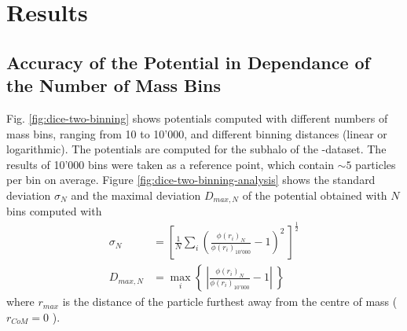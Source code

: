 \section{Results}\label{chap:results}




\subsection{Accuracy of the Potential in Dependance of the Number of Mass Bins}


Fig. \ref{fig:dice-two-binning} shows potentials computed with different numbers of mass bins, ranging from 10 to 10'000, and different binning distances (linear or logarithmic).
The potentials are computed for the subhalo of the \dt-dataset.
The results of 10'000 bins were taken as a reference point, which contain $\sim 5$ particles per bin on average.
Figure \ref{fig:dice-two-binning-analysis} shows the standard deviation $\sigma_N$ and the maximal deviation $D_{max,N}$ of the potential obtained with $N$ bins computed with
%
\begin{align}
	\sigma_N &= \left[ \frac{1}{N} \sum\limits_{i} \left( \frac{\phi(r_i)_N }{\phi(r_{i})_{10'000}} -1 \right)^2 \ \right] ^{\frac{1}{2}} \label{eq:Dtot} \\
	D_{max,N} &= \max \limits_{i} \left\{ \ \left | \frac{\phi(r_i)_N }{\phi(r_{i})_{10'000}} - 1 \right | \ \right\} \label{eq:Dmax}
\end{align}
%
where $r_{max}$ is the distance of the particle furthest away from the centre of mass ($r_{CoM}=0$ ). 











